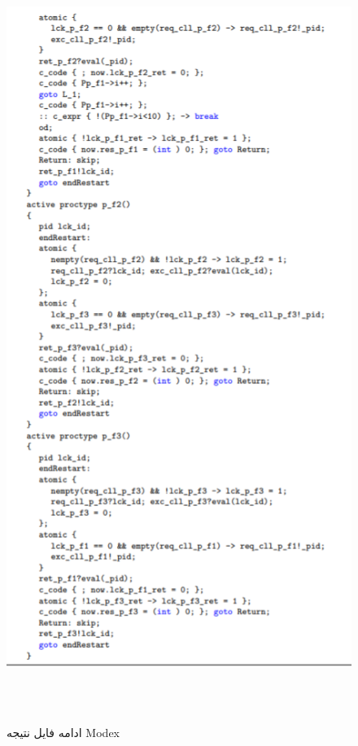  \begin{figure}
	\centering
	\includegraphics[height=25cm,width=12cm]{d2.png}
	\caption{ادامه فایل نتیجه Modex}
	\centering
\end{figure}

